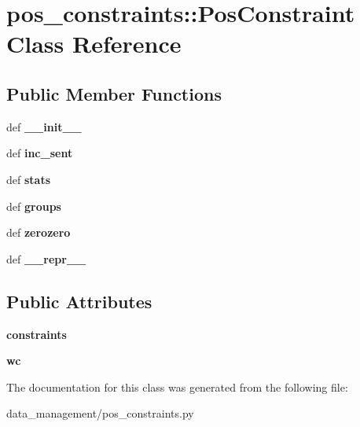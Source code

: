 \hypertarget{classpos__constraints_1_1PosConstraint}{
\section{pos\_\-constraints::PosConstraint Class Reference}
\label{classpos__constraints_1_1PosConstraint}
}
\subsection*{Public Member Functions}
\begin{DoxyCompactItemize}
\item 
\hypertarget{classpos__constraints_1_1PosConstraint_abb264f9fc2420da50ce0e0daaf2166f8}{
def {\bfseries \_\-\_\-init\_\-\_\-}}
\label{classpos__constraints_1_1PosConstraint_abb264f9fc2420da50ce0e0daaf2166f8}

\item 
\hypertarget{classpos__constraints_1_1PosConstraint_a93a1a761ece40bc0e28f810f3a2b0a3d}{
def {\bfseries inc\_\-sent}}
\label{classpos__constraints_1_1PosConstraint_a93a1a761ece40bc0e28f810f3a2b0a3d}

\item 
\hypertarget{classpos__constraints_1_1PosConstraint_addd4fd53eb12f6556c7f13c52b698b6a}{
def {\bfseries stats}}
\label{classpos__constraints_1_1PosConstraint_addd4fd53eb12f6556c7f13c52b698b6a}

\item 
\hypertarget{classpos__constraints_1_1PosConstraint_acc95bb2691939fe0255dcc0aa4c4791b}{
def {\bfseries groups}}
\label{classpos__constraints_1_1PosConstraint_acc95bb2691939fe0255dcc0aa4c4791b}

\item 
\hypertarget{classpos__constraints_1_1PosConstraint_a3163f81a0f3e16b72c41074fca058e23}{
def {\bfseries zerozero}}
\label{classpos__constraints_1_1PosConstraint_a3163f81a0f3e16b72c41074fca058e23}

\item 
\hypertarget{classpos__constraints_1_1PosConstraint_a6a9d44fb9cd4af4304e498373b1e98af}{
def {\bfseries \_\-\_\-repr\_\-\_\-}}
\label{classpos__constraints_1_1PosConstraint_a6a9d44fb9cd4af4304e498373b1e98af}

\end{DoxyCompactItemize}
\subsection*{Public Attributes}
\begin{DoxyCompactItemize}
\item 
\hypertarget{classpos__constraints_1_1PosConstraint_a9cc41ca57a818666f83ac2f5314371f3}{
{\bfseries constraints}}
\label{classpos__constraints_1_1PosConstraint_a9cc41ca57a818666f83ac2f5314371f3}

\item 
\hypertarget{classpos__constraints_1_1PosConstraint_ac6a4033f0b81519578a9b3da1fc1ba8e}{
{\bfseries wc}}
\label{classpos__constraints_1_1PosConstraint_ac6a4033f0b81519578a9b3da1fc1ba8e}

\end{DoxyCompactItemize}


The documentation for this class was generated from the following file:\begin{DoxyCompactItemize}
\item 
data\_\-management/pos\_\-constraints.py\end{DoxyCompactItemize}
